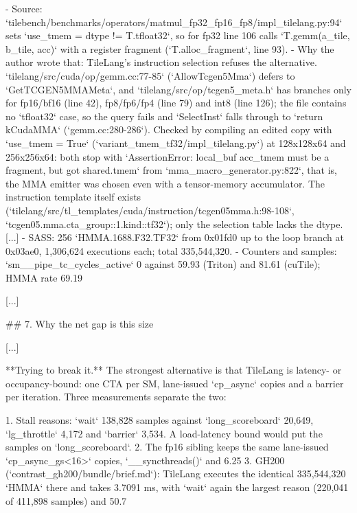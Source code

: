 \begin{promptbox}
- Source: `tilebench/benchmarks/operators/matmul_fp32_fp16_fp8/impl_tilelang.py:94` sets `use_tmem = dtype != T.tfloat32`, so for fp32 line 106 calls `T.gemm(a_tile, b_tile, acc)` with a register fragment (`T.alloc_fragment`, line 93).
- Why the author wrote that: TileLang's instruction selection refuses the alternative. `tilelang/src/cuda/op/gemm.cc:77-85` (`AllowTcgen5Mma`) defers to `GetTCGEN5MMAMeta`, and `tilelang/src/op/tcgen5_meta.h` has branches only for fp16/bf16 (line 42), fp8/fp6/fp4 (line 79) and int8 (line 126); the file contains no `tfloat32` case, so the query fails and `SelectInst` falls through to `return kCudaMMA` (`gemm.cc:280-286`). Checked by compiling an edited copy with `use_tmem = True` (`variant_tmem_tf32/impl_tilelang.py`) at 128x128x64 and 256x256x64: both stop with `AssertionError: local_buf acc_tmem must be a fragment, but got shared.tmem` from `mma_macro_generator.py:822`, that is, the MMA emitter was chosen even with a tensor-memory accumulator. The instruction template itself exists (`tilelang/src/tl_templates/cuda/instruction/tcgen05mma.h:98-108`, `tcgen05.mma.cta_group::1.kind::tf32`); only the selection table lacks the dtype.
[...]
- SASS: 256 `HMMA.1688.F32.TF32` from 0x01fd0 up to the loop branch at 0x03ae0, 1,306,624 executions each; total 335,544,320.
- Counters and samples: `sm__pipe_tc_cycles_active` 0 against 59.93 (Triton) and 81.61 (cuTile); HMMA rate 69.19%

[...]

## 7. Why the net gap is this size

[...]

**Trying to break it.** The strongest alternative is that TileLang is latency- or occupancy-bound: one CTA per SM, lane-issued `cp_async` copies and a barrier per iteration. Three measurements separate the two:

1. Stall reasons: `wait` 138,828 samples against `long_scoreboard` 20,649, `lg_throttle` 4,172 and `barrier` 3,534. A load-latency bound would put the samples on `long_scoreboard`.
2. The fp16 sibling keeps the same lane-issued `cp_async_gs<16>` copies, `__syncthreads()` and 6.25%
3. GH200 (`contrast_gh200/bundle/brief.md`): TileLang executes the identical 335,544,320 `HMMA` there and takes 3.7091 ms, with `wait` again the largest reason (220,041 of 411,898 samples) and 50.7%


\end{promptbox}

